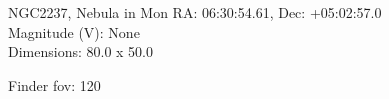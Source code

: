 \begin{block}{NGC2237, Nebula in Mon}
    RA: 06:30:54.61, Dec: +05:02:57.0 \\ 
    Magnitude (V): None \\ 
    Dimensions: 80.0 x 50.0 

    Finder fov: 120 
\end{block}